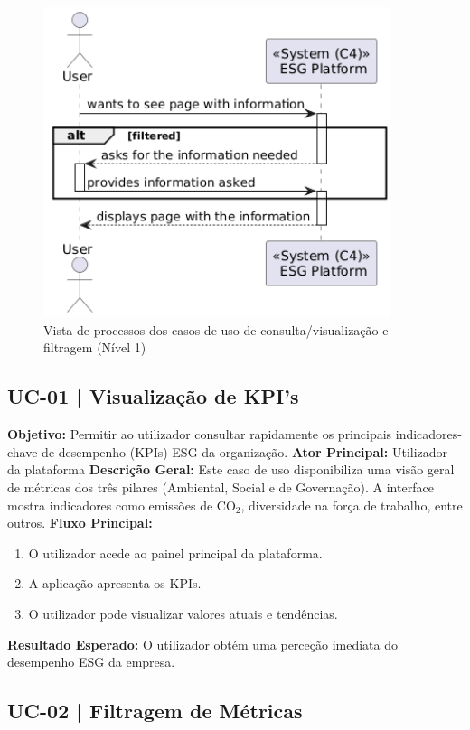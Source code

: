 \begin{figure}[h]
\centering
\includegraphics[width=4in]{frontmatter/assets/diagrams/Process Views/UC12345-lvl1.png}
\caption{Vista de processos dos casos de uso de consulta/visualização e filtragem (Nível 1)}
\label{fig:UC12345-lvl1}
\end{figure}


\subsection{UC-01 | Visualização de KPI's}

\textbf{Objetivo:} Permitir ao utilizador consultar rapidamente os principais indicadores-chave de desempenho (KPIs) ESG da organização.
\textbf{Ator Principal:} Utilizador da plataforma
\textbf{Descrição Geral:} Este caso de uso disponibiliza uma visão geral de métricas dos três pilares (Ambiental, Social e de Governação). A interface mostra indicadores como emissões de CO$_2$, diversidade na força de trabalho, entre outros.
\textbf{Fluxo Principal:}
\begin{enumerate}
    \item O utilizador acede ao painel principal da plataforma.
    \item A aplicação apresenta os KPIs.
    \item O utilizador pode visualizar valores atuais e tendências.
\end{enumerate}
\textbf{Resultado Esperado:} O utilizador obtém uma perceção imediata do desempenho ESG da empresa.

\subsection{UC-02 | Filtragem de Métricas}

